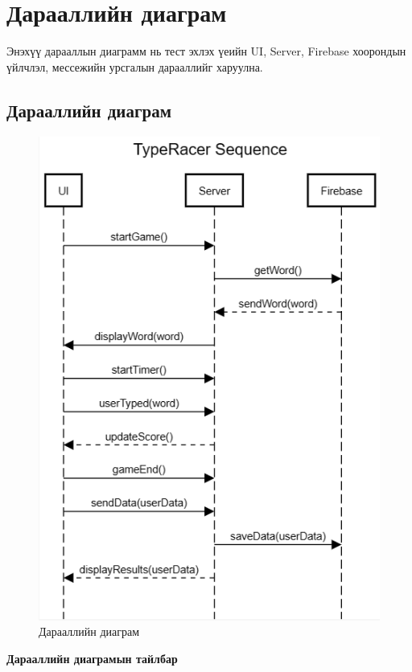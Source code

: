 \pagebreak

\section{Дарааллийн диаграм}
Энэхүү дарааллын диаграмм нь тест эхлэх үеийн UI, Server, Firebase хоорондын үйлчлэл, мессежийн урсгалын дарааллийг харуулна.

\subsection{Дарааллийн диаграм}
\begin{figure}[h]
	\centering
	\includegraphics[width=12cm]{images/sequence_diagram.png}
	\caption{Дарааллийн диаграм}
	\label{fig:usecase}
\end{figure}
\pagebreak

\textbf{Дарааллийн диаграмын тайлбар}

